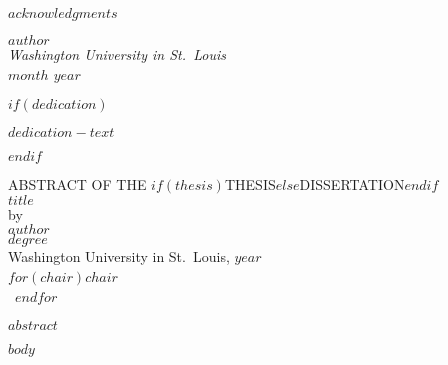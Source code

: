 \documentclass[12pt, oneside, openany]{book}
\begin{document}
$acknowledgments$

\hfill $author$\\
\textit{Washington University in St.~Louis}\\
\textit{$month$ $year$}

$if(dedication)$
    \clearpage
    \null
    \vfill
    \begin{center}
        $dedication-text$
    \end{center}
    \vfill
$endif$

\clearpage
{}
\begin{center}
    ABSTRACT OF THE $if(thesis)$THESIS$else$DISSERTATION$endif$\\
    $title$\\
    by\\
    $author$\\
    $degree$\\
    Washington University in St.~Louis, $year$\\
    $for(chair)$$chair$~\\~$endfor$
\end{center}
$abstract$

\mainmatter

$body$

\clearpage
\printbibliography[heading=bibintoc]
\end{document}

